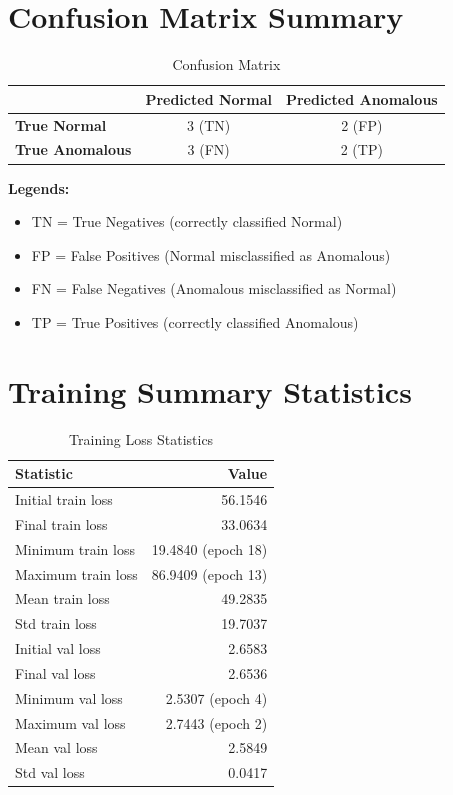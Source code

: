 \documentclass[11pt,a4paper]{article}
\begin{document}
\section{Confusion Matrix Summary}

\begin{table}[H]
\centering
\caption{Confusion Matrix}
\begin{tabular}{lcc}
\toprule
 & \textbf{Predicted Normal} & \textbf{Predicted Anomalous} \\
\midrule
\textbf{True Normal} & 3 (TN) & 2 (FP) \\
\textbf{True Anomalous} & 3 (FN) & 2 (TP) \\
\bottomrule
\end{tabular}
\end{table}

\textbf{Legends:}
\begin{itemize}
    \item TN = True Negatives (correctly classified Normal)
    \item FP = False Positives (Normal misclassified as Anomalous)
    \item FN = False Negatives (Anomalous misclassified as Normal)
    \item TP = True Positives (correctly classified Anomalous)
\end{itemize}

\section{Training Summary Statistics}

\begin{table}[H]
\centering
\caption{Training Loss Statistics}
\begin{tabular}{lr}
\toprule
\textbf{Statistic} & \textbf{Value} \\
\midrule
Initial train loss & 56.1546 \\
Final train loss & 33.0634 \\
Minimum train loss & 19.4840 (epoch 18) \\
Maximum train loss & 86.9409 (epoch 13) \\
Mean train loss & 49.2835 \\
Std train loss & 19.7037 \\
\midrule
Initial val loss & 2.6583 \\
Final val loss & 2.6536 \\
Minimum val loss & 2.5307 (epoch 4) \\
Maximum val loss & 2.7443 (epoch 2) \\
Mean val loss & 2.5849 \\
Std val loss & 0.0417 \\
\bottomrule
\end{tabular}
\end{table}
\end{document}
